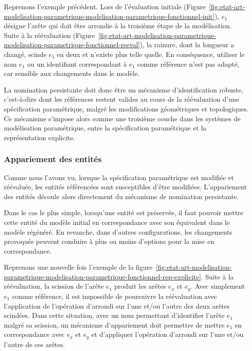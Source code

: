 Reprenons l'exemple précédent. %
Lors de l'évaluation initiale
(Figure~\ref{fig:etat-art-modelisation-parametrique-modelisation-parametrique-fonctionnel-init}),
$e_{1}$ désigne l'arête qui doit être arrondie à la troisième étape de la
modélisation. %
Suite à la réévaluation
(Figure~\ref{fig:etat-art-modelisation-parametrique-modelisation-parametrique-fonctionnel-reeval}),
la rainure, dont la longueur a changé, scinde $e_{1}$ en deux et n'existe plus
telle quelle. %
En conséquence, utiliser le nom $e_{1}$ ou un identifiant correspondant à $e_{1}$ comme référence n'est pas adapté, car sensible aux changements dans le modèle. %

La nomination persistante doit donc être un mécanisme d'identification robuste,
c'est-à-dire dont les références restent valides au cours de la réévaluation
d'une spécification paramétrique, malgré les modifications géométriques et
topologiques. %
Ce mécanisme s'impose alors comme une troisième couche dans les systèmes de
modélisation paramétrique, entre la spécification paramétrique et la
représentation explicite. %

\subsubsection{Appariement des entités}
\label{sec:etat-art-modelisation-parametrique-nomination-appariement}

Comme nous l'avons vu, lorsque la spécification paramétrique est modifiée et
réévaluée, les entités référencées sont susceptibles d'être modifiées. %
L'appariement des entités découle alors directement du mécanisme de nomination
persistante. %

Dans le cas le plus simple, lorsqu'une entité est préservée, il faut pouvoir
mettre cette entité du modèle initial en correspondance avec son équivalent dans
le modèle régénéré. %
En revanche, dans d'autres configurations, les changements provoqués peuvent
conduire à plus ou moins d'options pour la mise en correspondance. %

Reprenons une nouvelle fois l'exemple de la
figure~\ref{fig:etat-art-modelisation-parametrique-modelisation-parametrique-fonctionnel-rep-explicite}. %
Suite à la réévaluation, la scission de l'arête $e_{1}$ produit les arêtes
$e_{x}$ et $e_{y}$. %
Avec simplement $e_{1}$ comme référence, il est impossible de poursuivre la
réévaluation avec l'application de l'opération d'arrondi sur l'une et/ou l'autre
des deux arêtes scindées. %
Dans cette situation, avec un nom permettant d'identifier l'arête $e_{1}$ malgré
sa scission, un mécanisme d'appariement doit permettre de mettre $e_{1}$ en
correspondance avec $e_{x}$ et $e_{y}$ et d'appliquer l'opération d'arrondi sur
l'une et/ou l'autre de ces arêtes. %


